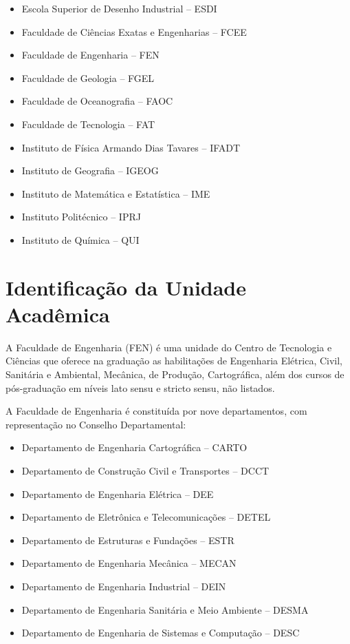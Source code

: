 \begin{itemize}

	\item Escola Superior de Desenho Industrial -- ESDI
	\item Faculdade de Ciências Exatas e Engenharias -- FCEE
	\item Faculdade de Engenharia -- FEN
	\item Faculdade de Geologia -- FGEL
	\item Faculdade de Oceanografia -- FAOC
	\item Faculdade de Tecnologia -- FAT
	\item Instituto de Física Armando Dias Tavares -- IFADT
	\item Instituto de Geografia -- IGEOG
	\item Instituto de Matemática e Estatística -- IME
	\item Instituto Politécnico -- IPRJ
	\item Instituto de Química -- QUI

\end{itemize}

\section{Identificação da Unidade Acadêmica}

A Faculdade de Engenharia (FEN) é uma unidade do Centro de Tecnologia e Ciências que oferece na graduação as habilitações de Engenharia Elétrica, Civil, Sanitária e Ambiental, Mecânica, de Produção, Cartográfica, além dos cursos de pós-graduação em níveis lato sensu e stricto sensu, não listados.

A Faculdade de Engenharia é constituída por nove departamentos, com representação no Conselho Departamental:

\begin{itemize}
	\item Departamento de Engenharia Cartográfica -- CARTO
	\item Departamento de Construção Civil e Transportes -- DCCT
	\item Departamento de Engenharia Elétrica -- DEE
	\item Departamento de Eletrônica e Telecomunicações -- DETEL
	\item Departamento de Estruturas e Fundações -- ESTR
	\item Departamento de Engenharia Mecânica -- MECAN
	\item Departamento de Engenharia Industrial -- DEIN
	\item Departamento de Engenharia Sanitária e Meio Ambiente -- DESMA
	\item Departamento de Engenharia de Sistemas e Computação -- DESC
\end{itemize}

